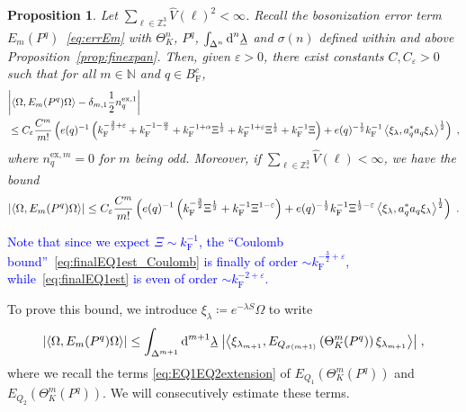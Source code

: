 \documentclass[12pt,a4paper]{article}
\numberwithin{equation}{section}
\newcommand{\NNN}{\mathbb{N}}
\newcommand{\ulambda}{\underline{\lambda}}
\newcommand{\1}{\mathbb{I}}
\newcommand{\di}{\textnormal{d}}
\newcommand{\ex}{\mathrm{ex}}
\newcommand{\F}{\mathrm{F}}
\newcommand{\Z}{\mathbb{Z}}
\newcommand{\half}{\frac{1}{2}}
\newcommand{\eva}[1]{\left\langle #1 \right\rangle}
\theoremstyle{plain}
\newtheorem{proposition}[theorem]{Proposition}
\theoremstyle{definition}
\theoremstyle{remark}
\theoremstyle{plain}
\theoremstyle{definition}
\theoremstyle{remark}
\begin{document}
\begin{proposition} \label{prop:finalEmest}
Let $ \sum_{\ell \in \Z^3_*} \hat{V}(\ell)^2 < \infty $. Recall the bosonization error term $E_m(P^q)$~\eqref{eq:errEm} with $ \Theta^n_K $, $ P^q $, $ \int_{\Delta^n} \di^n \ulambda $ and $ \sigma(n) $ defined within and above Proposition~\ref{prop:finexpan}. Then, given $ \varepsilon > 0 $, there exist constants $ C, C_\varepsilon > 0 $ such that for all $ m \in \NNN $ and $ q \in B_{\F}^c $,
\begin{align} \label{eq:finalEmest_Coulomb}
	&\abs{\eva{\Omega, E_m(P^q) \Omega} - \delta_{m,1} \frac 12 n_q^{\ex,1}} \nonumber\\
	&\leq C_\varepsilon \frac{C^m}{m!}
		\left( e(q)^{-1}\left( k_{\F}^{-\frac 32 + \varepsilon} 
		+ k_{\F}^{-1 - \frac{\alpha}{2}} 
		+ k_{\F}^{-1+\alpha} \Xi^\half
		+ k_{\F}^{-1+\varepsilon} \Xi^\half
		+ k_{\F}^{-1} \Xi \right) 
		+ e(q)^{-\half} k_{\F}^{-1} \eva{\xi_\lambda, a_q^* a_q \xi_\lambda}^{\half} \right) \;,
\end{align}
where $ n_q^{\ex,m} = 0 $ for $ m $ being odd.
Moreover, if $ \sum_{\ell \in \Z^3_*} \hat{V}(\ell) < \infty $, we have the bound
\begin{equation} \label{eq:finalEmest}
	\abs{\eva{\Omega, E_m(P^q) \Omega}}
	\leq C_\varepsilon \frac{C^m}{m!}
		\left( e(q)^{-1} \left( k_{\F}^{-\frac{3}{2}} \Xi^\half
		+ k_{\F}^{-1} \Xi^{1-\varepsilon} \right)
		+ e(q)^{-\half} k_{\F}^{-1} \Xi^{\half - \varepsilon} \eva{\xi_\lambda, a_q^* a_q \xi_\lambda}^{\half}  \right)\;.
\end{equation}
\end{proposition}

\textcolor{blue}{
Note that since we expect $ \Xi \sim k_{\F}^{-1} $, the ``Coulomb bound''~\eqref{eq:finalEQ1est_Coulomb} is finally of order $ \sim k_{\F}^{-\frac 32 + \varepsilon} $, while~\eqref{eq:finalEQ1est} is even of order $ \sim k_{\F}^{-2 + \varepsilon} $.
}

To prove this bound, we introduce $ \xi_\lambda \coloneq e^{- \lambda S} \Omega $ to write
\begin{equation} \label{eq:errEm2}
	\abs{\eva{\Omega, E_m(P^q) \Omega }}
	\le \int_{\Delta^{m+1}} \di^{m+1} \underline{\lambda} \;
		\abs{\eva{\xi_{\lambda_{m+1}}, E_{Q_{\sigma(m+1)}}\left(\Theta^{m}_{K}(P^q)\right) \xi_{\lambda_{m+1}}}} \;,
\end{equation}
where we recall the terms \eqref{eq:EQ1EQ2extension} of $ E_{Q_1}(\Theta^m_{K}(P^q)) $ and $ E_{Q_2}(\Theta^m_{K}(P^q)) $. We will consecutively estimate these terms.
\end{document}
